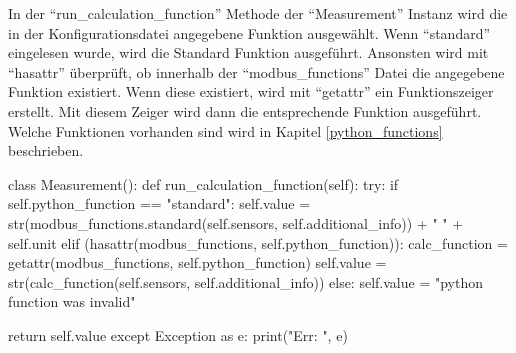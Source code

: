 In der \enquote{run\_calculation\_function} Methode der \enquote{Measurement} Instanz wird die in der Konfigurationsdatei angegebene Funktion ausgewählt. Wenn \enquote{standard} eingelesen wurde, wird die Standard Funktion ausgeführt. Ansonsten wird mit \enquote{hasattr} überprüft, ob innerhalb der \enquote{modbus\_functions} Datei die angegebene Funktion existiert. Wenn diese existiert, wird mit \enquote{getattr} ein Funktionszeiger erstellt. Mit diesem Zeiger wird dann die entsprechende Funktion ausgeführt. Welche Funktionen vorhanden sind wird in Kapitel \ref{python_functions} beschrieben. 

\begin{pythoncode}
class Measurement():
	def run_calculation_function(self):
		try:
			if self.python_function == "standard":
				self.value = str(modbus_functions.standard(self.sensors, self.additional_info)) + " " + self.unit
			elif (hasattr(modbus_functions, self.python_function)):
				calc_function = getattr(modbus_functions, self.python_function)
				self.value = str(calc_function(self.sensors, self.additional_info))
			else:
				self.value = "python function was invalid"
		
			return self.value
		except Exception as e:
			print("Err: ", e)
\end{pythoncode}
